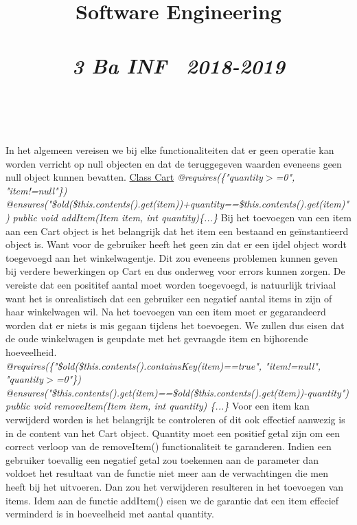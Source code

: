 \documentclass{article}
\title{\textmd{\textbf{Software Engineering}}\\\normalsize\vspace{0.1in}\Large{\assignmentname}\\\vspace{0.1in}\small{\textit{3 Ba INF \  2018-2019}}}
\author{\studentA \\ \studentB}
\begin{document}
\maketitle
\noindent
In het algemeen vereisen we bij elke functionaliteiten dat er geen operatie kan worden verricht op null objecten en dat de teruggegeven waarden eveneens geen null object kunnen bevatten.\newline
\underline{Class Cart}\newline
\textit{@requires(\{"quantity$>$=0", "item!=null"\})}\newline
\textit{@ensures("\$old(\$this.contents().get(item))+quantity==\$this.contents().get(item)")}\newline
\textit{public void addItem(Item item, int quantity)\{...\}}\newline
Bij het toevoegen van een item aan een Cart object is het belangrijk dat het item een bestaand en geïnstantieerd object is. Want voor de gebruiker heeft het geen zin dat er een ijdel object wordt toegevoegd aan het winkelwagentje. Dit zou eveneens problemen kunnen geven bij verdere bewerkingen op Cart en dus onderweg voor errors kunnen zorgen. De vereiste dat een posititef aantal moet worden toegevoegd, is natuurlijk triviaal want het is onrealistisch dat een gebruiker een negatief aantal items in zijn of haar winkelwagen wil.\newline
Na het toevoegen van een item moet er gegarandeerd worden dat er niets is mis gegaan tijdens het toevoegen. We zullen dus eisen dat de oude winkelwagen is geupdate met het gevraagde item en bijhorende hoeveelheid. \\

\noindent
\textit{@requires(\{"\$old(\$this.contents().containsKey(item)==true", "item!=null", "quantity$>$=0"\})} \newline
\textit{@ensures("\$this.contents().get(item)==\$old(\$this.contents().get(item))-quantity")} \newline
\textit{public void removeItem(Item item, int quantity) \{...\}} \newline
Voor een item kan verwijderd worden is het belangrijk te controleren of dit ook effectief aanwezig is in de content van het Cart object. Quantity moet een positief getal zijn om een correct verloop van de removeItem() functionaliteit te garanderen. Indien een gebruiker toevallig een negatief getal zou toekennen aan de parameter dan voldoet het resultaat van de functie niet meer aan de verwachtingen die men heeft bij het uitvoeren. Dan zou het verwijderen resulteren in het toevoegen van items. Idem aan de functie addItem() eisen we de garantie dat een item effecief verminderd is in hoeveelheid met aantal quantity. \\
\end{document}
